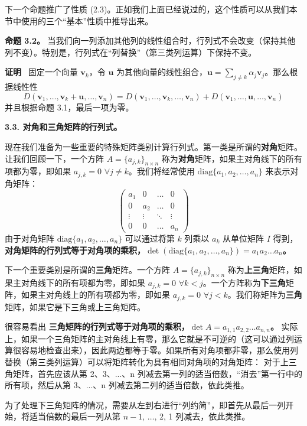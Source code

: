 下一个命题推广了性质 (2.3)。正如我们上面已经说过的，这个性质可以从我们本节中使用的三个“基本”性质中推导出来。

\textbf{命题 3.2。} 当我们向一列添加其他列的线性组合时，行列式不会改变（保持其他列不变）。特别是，行列式在“列替换”（第三类列运算）下保持不变。

\textbf{证明}~ 固定一个向量 $\mathbf{v}_k$，令 $\mathbf{u}$ 为其他向量的线性组合，$\mathbf{u} = \sum_{j \neq k} \alpha_j \mathbf{v}_j$。那么根据线性性
$$
D(\mathbf{v}_1, \dots, \mathbf{v}_k + \mathbf{u}, \dots, \mathbf{v}_n) = D(\mathbf{v}_1, \dots, \mathbf{v}_k, \dots, \mathbf{v}_n) + D(\mathbf{v}_1, \dots, \mathbf{u}, \dots, \mathbf{v}_n)
$$
并且根据命题 3.1，最后一项为零。

\textbf{3.3. 对角和三角矩阵的行列式。}

现在我们准备为一些重要的特殊矩阵类别计算行列式。第一类是所谓的\textbf{对角}矩阵。让我们回顾一下，一个方阵 $A = \{a_{j,k}\}_{n \times n}$ 称为\textbf{对角}矩阵，如果主对角线下的所有项都为零，即如果 $a_{j,k} = 0$ $\forall j \neq k$。我们将经常使用 $\text{diag}\{a_1, a_2, \dots, a_n\}$ 来表示对角矩阵：
$$
\begin{pmatrix}
a_1 & 0 & \dots & 0 \\
0 & a_2 & \dots & 0 \\
\vdots & \vdots & \ddots & \vdots \\
0 & 0 & \dots & a_n
\end{pmatrix}
$$
由于对角矩阵 $\text{diag}\{a_1, a_2, \dots, a_n\}$ 可以通过将第 $k$ 列乘以 $a_k$ 从单位矩阵 $I$ 得到，
\textbf{对角矩阵的行列式等于对角项的乘积，$\det(\text{diag}\{a_1, a_2, \dots, a_n\}) = a_1 a_2 \dots a_n$。}

下一个重要类别是所谓的\textbf{三角}矩阵。一个方阵 $A = \{a_{j,k}\}_{n \times n}$ 称为\textbf{上三角}矩阵，如果主对角线下的所有项都为零，即如果 $a_{j,k} = 0$ $\forall k < j$。一个方阵称为\textbf{下三角}矩阵，如果主对角线上的所有项都为零，即如果 $a_{j,k} = 0$ $\forall j < k$。我们称矩阵为\textbf{三角}矩阵，如果它是下三角或上三角矩阵。

很容易看出
\textbf{三角矩阵的行列式等于对角项的乘积，$\det A = a_{1,1} a_{2,2} \dots a_{n,n}$。}
实际上，如果一个三角矩阵的主对角线上有零，那么它就是不可逆的（这可以通过列运算很容易地检查出来），因此两边都等于零。如果所有对角项都非零，那么使用列替换（第三类列运算）可以将矩阵转化为具有相同对角项的对角矩阵：
对于上三角矩阵，首先应该从第 2、3、...、n 列减去第一列的适当倍数，“消去”第一行中的所有项，然后从第 3、...、n 列减去第二列的适当倍数，依此类推。

为了处理下三角矩阵的情况，需要从左到右进行“列约简”，即首先从最后一列开始，将适当倍数的最后一列从第 $n-1$, $\dots$, 2, 1 列减去，依此类推。

